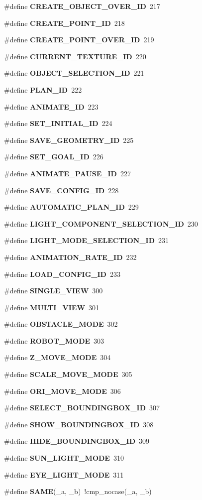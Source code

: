 \begin{CompactItemize}
\item 
\#define {\bf CREATE\_\-OBJECT\_\-OVER\_\-ID}\ 217
\item 
\#define {\bf CREATE\_\-POINT\_\-ID}\ 218
\item 
\#define {\bf CREATE\_\-POINT\_\-OVER\_\-ID}\ 219
\item 
\#define {\bf CURRENT\_\-TEXTURE\_\-ID}\ 220
\item 
\#define {\bf OBJECT\_\-SELECTION\_\-ID}\ 221
\item 
\#define {\bf PLAN\_\-ID}\ 222
\item 
\#define {\bf ANIMATE\_\-ID}\ 223
\item 
\#define {\bf SET\_\-INITIAL\_\-ID}\ 224
\item 
\#define {\bf SAVE\_\-GEOMETRY\_\-ID}\ 225
\item 
\#define {\bf SET\_\-GOAL\_\-ID}\ 226
\item 
\#define {\bf ANIMATE\_\-PAUSE\_\-ID}\ 227
\item 
\#define {\bf SAVE\_\-CONFIG\_\-ID}\ 228
\item 
\#define {\bf AUTOMATIC\_\-PLAN\_\-ID}\ 229
\item 
\#define {\bf LIGHT\_\-COMPONENT\_\-SELECTION\_\-ID}\ 230
\item 
\#define {\bf LIGHT\_\-MODE\_\-SELECTION\_\-ID}\ 231
\item 
\#define {\bf ANIMATION\_\-RATE\_\-ID}\ 232
\item 
\#define {\bf LOAD\_\-CONFIG\_\-ID}\ 233
\item 
\#define {\bf SINGLE\_\-VIEW}\ 300
\item 
\#define {\bf MULTI\_\-VIEW}\ 301
\item 
\#define {\bf OBSTACLE\_\-MODE}\ 302
\item 
\#define {\bf ROBOT\_\-MODE}\ 303
\item 
\#define {\bf Z\_\-MOVE\_\-MODE}\ 304
\item 
\#define {\bf SCALE\_\-MOVE\_\-MODE}\ 305
\item 
\#define {\bf ORI\_\-MOVE\_\-MODE}\ 306
\item 
\#define {\bf SELECT\_\-BOUNDINGBOX\_\-ID}\ 307
\item 
\#define {\bf SHOW\_\-BOUNDINGBOX\_\-ID}\ 308
\item 
\#define {\bf HIDE\_\-BOUNDINGBOX\_\-ID}\ 309
\item 
\#define {\bf SUN\_\-LIGHT\_\-MODE}\ 310
\item 
\#define {\bf EYE\_\-LIGHT\_\-MODE}\ 311
\item 
\#define {\bf SAME}(\_\-a, \_\-b)\ !cmp\_\-nocase(\_\-a, \_\-b)
\end{CompactItemize}
